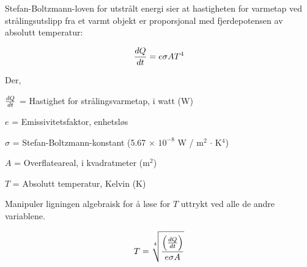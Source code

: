 
Stefan-Boltzmann-loven for utstrålt energi sier at hastigheten for varmetap ved strålingsutslipp fra et varmt objekt er proporsjonal med fjerdepotensen av absolutt temperatur:

$${dQ \over dt} = e \sigma A T^4$$

\noindent
Der,

$dQ \over dt$ = Hastighet for strålingsvarmetap, i watt (W)

$e$ = Emissivitetsfaktor, enhetsløs

$\sigma$ = Stefan-Boltzmann-konstant (5.67 $\times$ $10^{-8}$ W / m$^{2}$ $\cdot$ K$^{4}$)

$A$ = Overflateareal, i kvadratmeter (m$^{2}$)

$T$ = Absolutt temperatur, Kelvin (K)

\vskip 10pt

Manipuler ligningen algebraisk for å løse for $T$ uttrykt ved alle de andre variablene.







$$T = \root 4 \of {\left({dQ \over dt}\right) \over {e \sigma A}}$$









